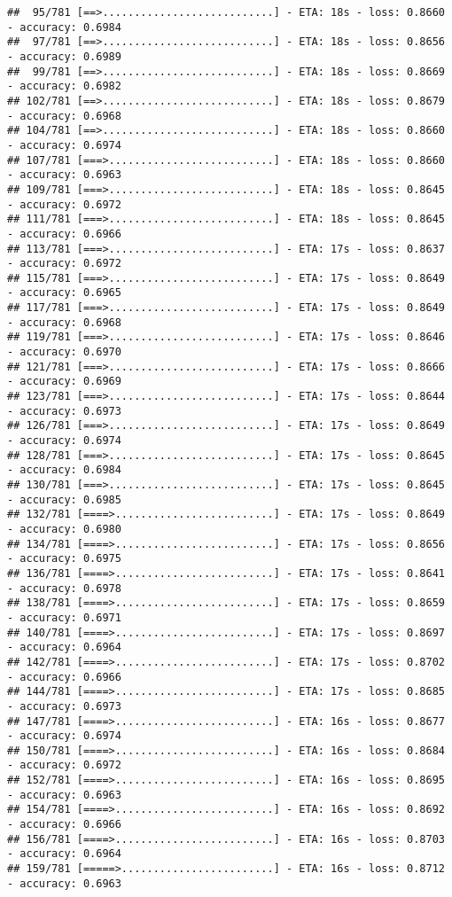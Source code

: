 \documentclass[
]{article}
\begin{document}
\begin{verbatim}
##  95/781 [==>...........................] - ETA: 18s - loss: 0.8660 - accuracy: 0.6984
##  97/781 [==>...........................] - ETA: 18s - loss: 0.8656 - accuracy: 0.6989
##  99/781 [==>...........................] - ETA: 18s - loss: 0.8669 - accuracy: 0.6982
## 102/781 [==>...........................] - ETA: 18s - loss: 0.8679 - accuracy: 0.6968
## 104/781 [==>...........................] - ETA: 18s - loss: 0.8660 - accuracy: 0.6974
## 107/781 [===>..........................] - ETA: 18s - loss: 0.8660 - accuracy: 0.6963
## 109/781 [===>..........................] - ETA: 18s - loss: 0.8645 - accuracy: 0.6972
## 111/781 [===>..........................] - ETA: 18s - loss: 0.8645 - accuracy: 0.6966
## 113/781 [===>..........................] - ETA: 17s - loss: 0.8637 - accuracy: 0.6972
## 115/781 [===>..........................] - ETA: 17s - loss: 0.8649 - accuracy: 0.6965
## 117/781 [===>..........................] - ETA: 17s - loss: 0.8649 - accuracy: 0.6968
## 119/781 [===>..........................] - ETA: 17s - loss: 0.8646 - accuracy: 0.6970
## 121/781 [===>..........................] - ETA: 17s - loss: 0.8666 - accuracy: 0.6969
## 123/781 [===>..........................] - ETA: 17s - loss: 0.8644 - accuracy: 0.6973
## 126/781 [===>..........................] - ETA: 17s - loss: 0.8649 - accuracy: 0.6974
## 128/781 [===>..........................] - ETA: 17s - loss: 0.8645 - accuracy: 0.6984
## 130/781 [===>..........................] - ETA: 17s - loss: 0.8645 - accuracy: 0.6985
## 132/781 [====>.........................] - ETA: 17s - loss: 0.8649 - accuracy: 0.6980
## 134/781 [====>.........................] - ETA: 17s - loss: 0.8656 - accuracy: 0.6975
## 136/781 [====>.........................] - ETA: 17s - loss: 0.8641 - accuracy: 0.6978
## 138/781 [====>.........................] - ETA: 17s - loss: 0.8659 - accuracy: 0.6971
## 140/781 [====>.........................] - ETA: 17s - loss: 0.8697 - accuracy: 0.6964
## 142/781 [====>.........................] - ETA: 17s - loss: 0.8702 - accuracy: 0.6966
## 144/781 [====>.........................] - ETA: 17s - loss: 0.8685 - accuracy: 0.6973
## 147/781 [====>.........................] - ETA: 16s - loss: 0.8677 - accuracy: 0.6974
## 150/781 [====>.........................] - ETA: 16s - loss: 0.8684 - accuracy: 0.6972
## 152/781 [====>.........................] - ETA: 16s - loss: 0.8695 - accuracy: 0.6963
## 154/781 [====>.........................] - ETA: 16s - loss: 0.8692 - accuracy: 0.6966
## 156/781 [====>.........................] - ETA: 16s - loss: 0.8703 - accuracy: 0.6964
## 159/781 [=====>........................] - ETA: 16s - loss: 0.8712 - accuracy: 0.6963

\end{verbatim}
\end{document}
